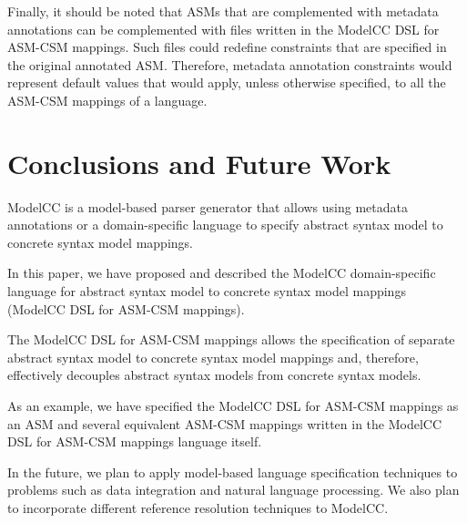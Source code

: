 \documentclass[floatfix,rmp,twocolumn,twoside]{revtex4}
\begin{document}
Finally, it should be noted that ASMs that are complemented with metadata annotations can be complemented with files written in the ModelCC DSL for ASM-CSM mappings.
Such files could redefine constraints that are specified in the original annotated ASM.
Therefore, metadata annotation constraints would represent default values that would apply, unless otherwise specified, to all the ASM-CSM mappings of a language.

\section{Conclusions and Future Work} \label{sec:conclusionsandfuturework}

\noindent ModelCC is a model-based parser generator that allows using metadata annotations or a domain-specific language to specify abstract syntax model to concrete syntax model mappings.

In this paper, we have proposed and described the ModelCC domain-specific language for abstract syntax model to concrete syntax model mappings (ModelCC DSL for ASM-CSM mappings).

The ModelCC DSL for ASM-CSM mappings allows the specification of separate abstract syntax model to concrete syntax model mappings and, therefore, effectively decouples abstract syntax models from concrete syntax models.

As an example, we have specified the ModelCC DSL for ASM-CSM mappings as an ASM and several equivalent ASM-CSM mappings written in the ModelCC DSL for ASM-CSM mappings language itself.

In the future, we plan to apply model-based language specification techniques to problems such as data integration and natural language processing.
We also plan to incorporate different reference resolution techniques to ModelCC.

\vspace{1mm}


\end{document}
